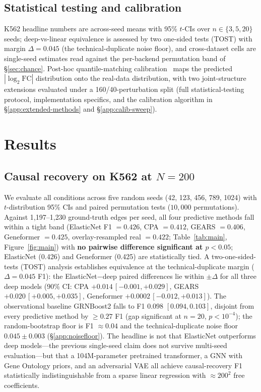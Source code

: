\documentclass{article}
\theoremstyle{plain}
\theoremstyle{definition}
\theoremstyle{remark}
\begin{document}
\subsection{Statistical testing and calibration}
K562 headline numbers are across-seed means with 95\% $t$-CIs over $n\in\{3,5,20\}$ seeds; deep-vs-linear equivalence is assessed by two one-sided tests (TOST) with margin $\Delta = 0.045$ (the technical-duplicate noise floor), and cross-dataset cells are single-seed estimates read against the per-backend permutation band of \S\ref{sec:chance}. Post-hoc quantile-matching calibration~\citep{bolstad2003,reinhard2001} maps the predicted $|\log_2\mathrm{FC}|$ distribution onto the real-data distribution, with two joint-structure extensions evaluated under a 160/40-perturbation split (full statistical-testing protocol, implementation specifics, and the calibration algorithm in \S\ref{app:extended-methods} and \S\ref{app:calib-sweep}).

\section{Results}
\label{sec:results}

\subsection{Causal recovery on K562 at $N{=}200$}
We evaluate all conditions across five random seeds (42, 123, 456, 789, 1024) with $t$-distribution 95\% CIs and paired permutation tests ($10{,}000$ permutations). Against 1{,}197--1{,}230 ground-truth edges per seed, all four predictive methods fall within a tight band (ElasticNet F1 $= 0.426$, CPA $= 0.412$, GEARS $= 0.406$, Geneformer $= 0.425$, overlay-resampled real $= 0.422$; Table~\ref{tab:main}, Figure~\ref{fig:main}) with \textbf{no pairwise difference significant at $p<0.05$}; ElasticNet (0.426) and Geneformer (0.425) are statistically tied. A two-one-sided-tests (TOST) analysis establishes equivalence at the technical-duplicate margin ($\Delta = 0.045$ F1): the ElasticNet$-$deep paired differences lie within $\pm\Delta$ for all three deep models (90\% CI: CPA $+0.014\,[-0.001, +0.029]$, GEARS $+0.020\,[+0.005, +0.035]$, Geneformer $+0.0002\,[-0.012, +0.013]$). The observational baseline GRNBoost2 falls to F1 $0.098$ $[0.094, 0.103]$, disjoint from every predictive method by $\geq 0.27$ F1 (gap significant at $n=20$, $p<10^{-4}$); the random-bootstrap floor is F1 $\approx 0.04$ and the technical-duplicate noise floor $0.045 \pm 0.003$ (\S\ref{app:noisefloor}). The headline is not that ElasticNet outperforms deep models---the previous single-seed claim does not survive multi-seed evaluation---but that a 104M-parameter pretrained transformer, a GNN with Gene Ontology priors, and an adversarial VAE all achieve causal-recovery F1 statistically indistinguishable from a sparse linear regression with $\approx\!200^2$ free coefficients.
\end{document}
